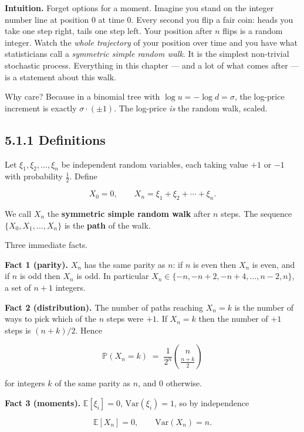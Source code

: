 \documentclass[
  10pt,
  twoside]{book}
\begin{document}
\textbf{Intuition.} Forget options for a moment. Imagine you stand on
the integer number line at position \(0\) at time \(0\). Every second
you flip a fair coin: heads you take one step right, tails one step
left. Your position after \(n\) flips is a random integer. Watch the
\emph{whole trajectory} of your position over time and you have what
statisticians call a \emph{symmetric simple random walk}. It is the
simplest non-trivial stochastic process. Everything in this chapter ---
and a lot of what comes after --- is a statement about this walk.

Why care? Because in a binomial tree with \(\log u = -\log d = \sigma\),
the log-price increment is exactly \(\sigma \cdot (\pm 1)\). The
log-price \emph{is} the random walk, scaled.

\subsection{5.1.1 Definitions}\label{definitions-15}

Let \(\xi_1, \xi_2, \ldots, \xi_n\) be independent random variables,
each taking value \(+1\) or \(-1\) with probability \(\tfrac12\). Define

\[X_0 = 0, \qquad X_n = \xi_1 + \xi_2 + \cdots + \xi_n.\]

We call \(X_n\) the \textbf{symmetric simple random walk} after \(n\)
steps. The sequence \(\{X_0, X_1, \ldots, X_n\}\) is the \textbf{path}
of the walk.

Three immediate facts.

\textbf{Fact 1 (parity).} \(X_n\) has the same parity as \(n\): if \(n\)
is even then \(X_n\) is even, and if \(n\) is odd then \(X_n\) is odd.
In particular \(X_n \in \{-n, -n+2, -n+4, \ldots, n-2, n\}\), a set of
\(n+1\) integers.

\textbf{Fact 2 (distribution).} The number of paths reaching \(X_n = k\)
is the number of ways to pick which of the \(n\) steps were \(+1\). If
\(X_n = k\) then the number of \(+1\) steps is \((n+k)/2\). Hence

\[\boxed{\;\mathbb P(X_n = k) \;=\; \frac{1}{2^n}\binom{n}{\tfrac{n+k}{2}}\;}\]

for integers \(k\) of the same parity as \(n\), and \(0\) otherwise.

\textbf{Fact 3 (moments).} \(\mathbb E[\xi_i] = 0\),
\(\mathrm{Var}(\xi_i) = 1\), so by independence

\[\mathbb E[X_n] = 0, \qquad \mathrm{Var}(X_n) = n.\]
\end{document}
